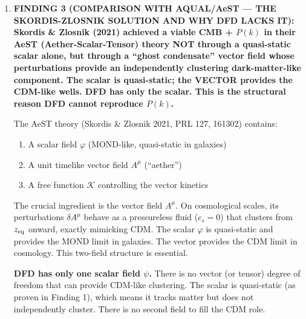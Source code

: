 \documentclass[11pt]{article}
\newcommand{\LCDM}{$\Lambda$CDM}
\newcommand{\Geff}{G_{\rm eff}}
\begin{document}
\begin{tcolorbox}[colback=blue!5!white, colframe=blue!70!black,
  title=\textbf{W4i18 TOP 5 FINDINGS --- QUASI-STATIC REGIME PROOF}]
\begin{enumerate}
  These are equivalent statements. The quasi-static psi-field provides
  a modified gravitational response (captured by $\Geff$) but does
  NOT act as an independently clustering component. The ``dark matter''
  role requires an independently clustering component with its own
  perturbation amplitude built up from $z_{\rm eq} \sim 3400$.

  \textbf{Quantitative confirmation}: The baryon growth from
  $z_{\rm dec} = 1100$ to $z = 0$ under $\Geff = G_N$ gives
  $\delta_b(0) \sim 10^{-5} \times 1100 \sim 10^{-2}$. In \LCDM,
  CDM has $\delta_{\rm CDM}(z_{\rm dec}) \sim 10^{-2}$ (from growth
  during $z_{\rm eq}$ to $z_{\rm dec}$), and baryons catch up to
  $\delta_{\rm CDM} \sim 10$ by $z = 0$. DFD baryons never reach
  the nonlinear regime on galaxy scales.

\item \textbf{FINDING 3 (COMPARISON WITH AQUAL/AeST --- THE SKORDIS-ZLOSNIK
  SOLUTION AND WHY DFD LACKS IT):
  Skordis \& Zlosnik (2021) achieved a viable CMB + $P(k)$ in their
  AeST (Aether-Scalar-Tensor) theory NOT through a quasi-static scalar
  alone, but through a ``ghost condensate'' vector field whose
  perturbations provide an independently clustering dark-matter-like
  component. The scalar is quasi-static; the VECTOR provides
  the CDM-like wells. DFD has only the scalar. This is the
  structural reason DFD cannot reproduce $P(k)$.}

  The AeST theory (Skordis \& Zlosnik 2021, PRL 127, 161302) contains:
  \begin{enumerate}[nosep]
  \item A scalar field $\varphi$ (MOND-like, quasi-static in galaxies)
  \item A unit timelike vector field $A^\mu$ (``aether'')
  \item A free function $\mathcal{K}$ controlling the vector kinetics
  \end{enumerate}

  The crucial ingredient is the vector field $A^\mu$. On cosmological
  scales, its perturbations $\delta A^\mu$ behave as a pressureless
  fluid ($c_s = 0$) that clusters from $z_{\rm eq}$ onward, exactly
  mimicking CDM. The scalar $\varphi$ is quasi-static and provides
  the MOND limit in galaxies. The vector provides the CDM limit in
  cosmology. This two-field structure is essential.

  \textbf{DFD has only one scalar field $\psi$.} There is no vector
  (or tensor) degree of freedom that can provide CDM-like clustering.
  The scalar is quasi-static (as proven in Finding 1), which means it
  tracks matter but does not independently cluster. There is no second
  field to fill the CDM role.


\end{enumerate}
\end{tcolorbox}
\end{document}
